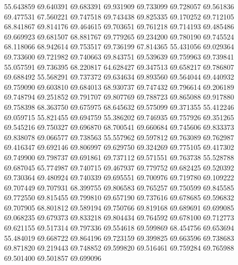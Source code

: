 55.643859
69.640391
69.683391
69.931909
69.733099
69.728057
69.561836
69.477531
67.560221
69.747518
69.743438
69.825335
69.170252
69.712105
68.841867
69.814176
69.464615
69.703651
69.761218
69.714193
69.485486
69.669923
69.681507
68.881767
69.779265
69.234200
69.780190
69.745524
68.118066
68.942614
69.753517
69.736199
67.814365
55.431056
69.029364
69.733600
69.721982
69.740663
69.843751
69.539639
69.759963
69.739841
55.057591
69.736395
68.220817
64.628427
69.347513
69.658217
69.786807
69.688492
55.568291
69.737372
69.634634
69.893560
69.564044
69.440932
69.759090
69.603810
69.684013
68.930737
69.747432
69.796614
69.206189
69.748794
69.251852
69.791707
69.807769
69.788723
69.865088
69.917880
69.758398
68.363750
69.675975
68.645632
69.575099
69.371355
55.412246
69.059715
55.821455
69.694759
55.386202
69.746935
69.757926
69.351265
69.545216
69.750327
69.696870
68.700541
69.660684
69.745606
69.833373
69.838078
69.066577
69.738563
55.557962
69.597812
69.763089
69.762987
69.416347
69.692146
69.806997
69.629750
69.324269
69.775105
69.417302
69.749900
69.798737
69.691861
69.737112
69.571551
69.763738
55.528788
69.687045
65.774987
69.740715
69.467937
69.779752
69.682425
69.520392
69.730364
69.480924
69.740339
69.695551
69.700976
69.719780
69.109222
69.707449
69.707931
68.399755
69.806583
69.765257
69.750599
69.845585
69.772550
69.815455
69.799810
69.657190
69.737616
69.678685
69.596832
69.707905
68.801812
69.589194
69.750766
69.819168
69.689691
69.699085
69.068235
69.679373
69.833218
69.804434
69.764592
69.678100
69.712773
69.621155
69.517314
69.797336
69.554618
69.599869
68.454756
69.653694
55.484019
69.668722
69.864196
69.723159
69.399825
69.663596
69.738683
69.871820
69.219443
69.748852
69.599820
69.516461
69.759284
69.765988
69.501400
69.501857
69.699096
